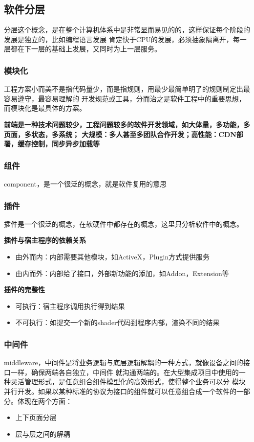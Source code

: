\subsection{软件分层}
分层这个概念，是在整个计算机体系中是非常显而易见的的，这样保证每个阶段的发展是独立的，比如编程语言发展
肯定快于CPU的发展，必须抽象隔离开，每一层都在下一层的基础上发展，又同时为上一层服务。

\subsubsection{模块化}
工程方案小而美不是指代码量少，而是指规则，用最少最简单明了的规则制定出最容易遵守，最容易理解的
开发规范或工具，分而治之是软件工程中的重要思想，而模块化是最具体的方案。

\textbf{前端是一种技术问题较少，工程问题较多的软件开发领域，如大体量，多功能，多页面，多状态，多系统；
大规模：多人甚至多团队合作开发；高性能：CDN部署，缓存控制，同步异步加载等}

\subsubsection{组件}
component，是一个很泛的概念，就是软件复用的意思

\subsubsection{插件}
插件是一个很泛的概念，在软硬件中都存在的概念，这里只分析软件中的概念。

\textbf{插件与宿主程序的依赖关系}
\begin{itemize}
    \item {由外而内：内部需要其他模块，如ActiveX，Plugin方式提供服务}
    \item {由内而外：内部给了接口，外部新功能的添加，如Addon，Extension等}
\end{itemize}

\textbf{插件的完整性}
\begin{itemize}
    \item {可执行：宿主程序调用执行得到结果}
    \item {不可执行：如提交一个新的shader代码到程序内部，渲染不同的结果}
\end{itemize}

\subsubsection{中间件}
middleware，中间件是将业务逻辑与底层逻辑解耦的一种方式，就像设备之间的接口一样，确保两端各自独立，中间件
就沟通两端的。在大型集成项目中使用的一种灵活管理形式，是任意组合组件模型化的高效形式，使得整个业务可以分
模块并行开发。如果以某种标准的协议为接口的组件就可以任意组合成一个软件的一部分。体现在两个方面：
\begin{itemize}
    \item {上下页面分层}
    \item {层与层之间的解耦}
\end{itemize}


